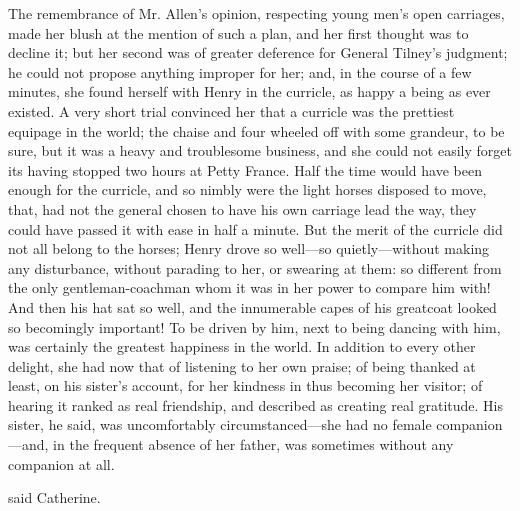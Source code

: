 The remembrance of Mr. Allen's opinion, respecting young men's open carriages, made her blush at the mention of such a plan, and her first thought was to decline it; but her second was of greater deference for General Tilney's judgment; he could not propose anything improper for her; and, in the course of a few minutes, she found herself with Henry in the curricle, as happy a being as ever existed. A very short trial convinced her that a curricle was the prettiest equipage in the world; the chaise and four wheeled off with some grandeur, to be sure, but it was a heavy and troublesome business, and she could not easily forget its having stopped two hours at Petty France. Half the time would have been enough for the curricle, and so nimbly were the light horses disposed to move, that, had not the general chosen to have his own carriage lead the way, they could have passed it with ease in half a minute. But the merit of the curricle did not all belong to the horses; Henry drove so well---so quietly---without making any disturbance, without parading to her, or swearing at them: so different from the only gentleman-coachman whom it was in her power to compare him with! And then his hat sat so well, and the innumerable capes of his greatcoat looked so becomingly important! To be driven by him, next to being dancing with him, was certainly the greatest happiness in the world. In addition to every other delight, she had now that of listening to her own praise; of being thanked at least, on his sister's account, for her kindness in thus becoming her visitor; of hearing it ranked as real friendship, and described as creating real gratitude. His sister, he said, was uncomfortably circumstanced---she had no female companion---and, in the frequent absence of her father, was sometimes without any companion at all.

 said Catherine. 






